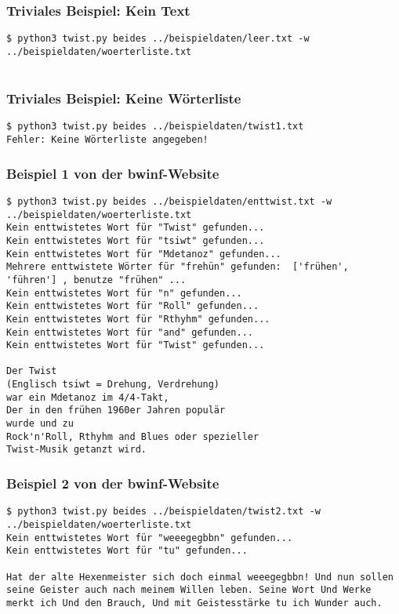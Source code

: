 \documentclass[a4paper,10pt,ngerman]{scrartcl}
\begin{document}
\subsubsection{Triviales Beispiel: Kein Text}
\begin{lstlisting}[breaklines=true]
  $ python3 twist.py beides ../beispieldaten/leer.txt -w ../beispieldaten/woerterliste.txt


\end{lstlisting}


\subsubsection{Triviales Beispiel: Keine Wörterliste}
\begin{lstlisting}[breaklines=true]
$ python3 twist.py beides ../beispieldaten/twist1.txt
Fehler: Keine Wörterliste angegeben!
\end{lstlisting}


\subsubsection{Beispiel 1 von der bwinf-Website}
\begin{lstlisting}[breaklines=true]
$ python3 twist.py beides ../beispieldaten/enttwist.txt -w ../beispieldaten/woerterliste.txt
Kein enttwistetes Wort für "Twist" gefunden...
Kein enttwistetes Wort für "tsiwt" gefunden...
Kein enttwistetes Wort für "Mdetanoz" gefunden...
Mehrere enttwistete Wörter für "frehün" gefunden:  ['frühen', 'führen'] , benutze "frühen" ...
Kein enttwistetes Wort für "n" gefunden...
Kein enttwistetes Wort für "Roll" gefunden...
Kein enttwistetes Wort für "Rthyhm" gefunden...
Kein enttwistetes Wort für "and" gefunden...
Kein enttwistetes Wort für "Twist" gefunden...

Der Twist
(Englisch tsiwt = Drehung, Verdrehung)
war ein Mdetanoz im 4/4-Takt,
Der in den frühen 1960er Jahren populär
wurde und zu
Rock'n'Roll, Rthyhm and Blues oder spezieller
Twist-Musik getanzt wird.
\end{lstlisting}


\subsubsection{Beispiel 2 von der bwinf-Website}
\begin{lstlisting}[breaklines=true]
$ python3 twist.py beides ../beispieldaten/twist2.txt -w ../beispieldaten/woerterliste.txt
Kein enttwistetes Wort für "weeegegbbn" gefunden...
Kein enttwistetes Wort für "tu" gefunden...

Hat der alte Hexenmeister sich doch einmal weeegegbbn! Und nun sollen seine Geister auch nach meinem Willen leben. Seine Wort Und Werke merkt ich Und den Brauch, Und mit Geistesstärke tu ich Wunder auch.
\end{lstlisting}
\end{document}
